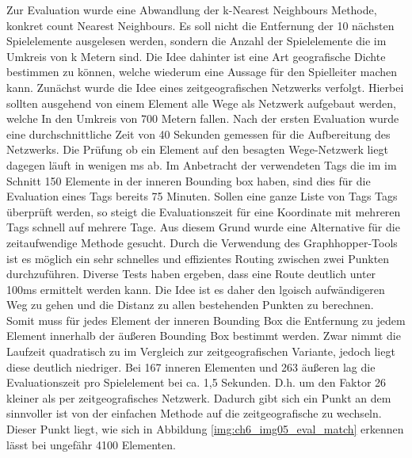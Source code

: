 Zur Evaluation wurde eine Abwandlung der k-Nearest Neighbours Methode, konkret count Nearest Neighbours.
Es soll nicht die Entfernung der 10 nächsten Spielelemente ausgelesen werden, sondern die Anzahl der Spielelemente die im  Umkreis von k Metern sind. Die Idee dahinter ist eine Art geografische Dichte bestimmen zu können, welche wiederum eine Aussage für den Spielleiter machen kann.
Zunächst wurde die Idee eines zeitgeografischen Netzwerks verfolgt. Hierbei sollten ausgehend von einem Element alle Wege als Netzwerk aufgebaut werden, welche In den Umkreis von 700 Metern fallen. Nach der ersten Evaluation wurde eine durchschnittliche Zeit von 40 Sekunden gemessen für die Aufbereitung des Netzwerks. Die Prüfung ob ein Element auf den besagten Wege-Netzwerk liegt dagegen läuft in wenigen ms ab.
Im Anbetracht der verwendeten Tags die im im Schnitt 150 Elemente in der inneren Bounding box haben, sind dies für die Evaluation eines Tags  
bereits 75 Minuten. Sollen eine ganze Liste von Tags Tags überprüft werden, so steigt die Evaluationszeit für eine Koordinate mit mehreren Tags schnell auf mehrere Tage.
Aus diesem Grund wurde eine Alternative für die zeitaufwendige Methode gesucht.
Durch die Verwendung des Graphhopper-Tools ist es möglich ein sehr schnelles und effizientes Routing zwischen zwei Punkten durchzuführen.
Diverse Tests haben ergeben, dass eine Route deutlich unter 100ms ermittelt werden kann. Die Idee ist es daher den lgoisch aufwändigeren Weg zu gehen und die Distanz zu allen bestehenden Punkten zu berechnen. Somit muss für jedes Element der inneren Bounding Box die Entfernung zu jedem Element innerhalb der äußeren Bounding Box bestimmt werden. Zwar nimmt die Laufzeit quadratisch zu im Vergleich zur zeitgeografischen Variante, jedoch liegt diese deutlich niedriger. Bei 167 inneren Elementen und 263 äußeren lag die Evaluationszeit pro Spielelement bei ca. 1,5 Sekunden. D.h. um den Faktor 26 kleiner als per zeitgeografisches Netzwerk. Dadurch gibt sich ein Punkt an dem sinnvoller ist von der einfachen Methode auf die zeitgeografische zu wechseln.
Dieser Punkt liegt, wie sich in Abbildung \ref{img:ch6_img05_eval_match} erkennen lässt bei ungefähr 4100 Elementen.


